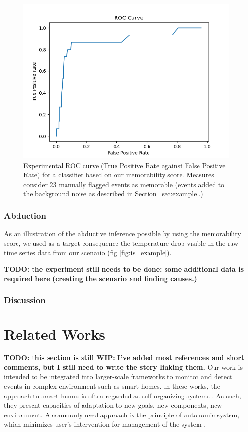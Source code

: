 \documentclass[conference]{IEEEtran}
\begin{document}
\begin{figure}[ht]
  \centering
  \includegraphics[width=\linewidth]{./figures/roc}
  \caption{Experimental ROC curve (True Positive Rate against False Positive
    Rate) for a classifier based on our memorability score. Measures consider 23
    manually flagged events as memorable (events added to the background noise
    as described in Section~\ref{sec:example}.)}
  \label{fig:roc}
\end{figure}
\subsubsection{Abduction}

As an illustration of the abductive inference possible by using the memorability
score, we used as a target consequence the temperature drop visible in the raw
time series data from our scenario (fig \ref{fig:ts_example}).

\textbf{TODO: the experiment still needs to be done: some additional data is required here (creating the scenario and finding causes.)}


\subsubsection{Discussion}
\label{ssub:discussion}

\section{Related Works}
\label{sec:related}
\textbf{TODO: this section is still WIP: I've added most references and short comments, but I still need to write the story linking them.}
Our work is intended to be integrated into larger-scale frameworks to monitor
and detect events in complex environment such as smart homes. In these works, the
approach to smart homes is often regarded as self-organizing systems \cite{kramer_rigorous_2009,kounev_notion_2017}. As such, they present capacities of adaptation to new goals,
new components, new environment. A commonly used approach is the principle of
autonomic system, which minimizes user's intervention for management of the
system \cite{kounev_notion_2017,kephart_vision_2003}.
\end{document}
